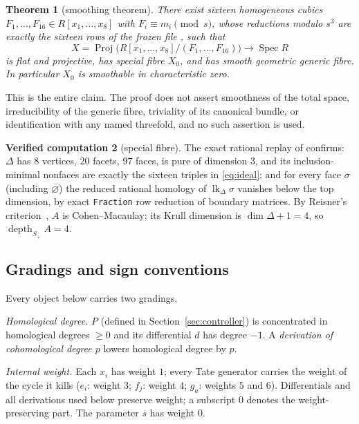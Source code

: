\documentclass[11pt]{article}
\newtheorem{theorem}{Theorem}[section]
\theoremstyle{definition}
\newtheorem{computation}[theorem]{Verified computation}
\theoremstyle{remark}
\newcommand{\Spec}{\operatorname{Spec}}
\newcommand{\Proj}{\operatorname{Proj}}
\newcommand{\depth}{\operatorname{depth}}
\begin{document}
\begin{theorem}[smoothing theorem]\label{thm:main}
There exist sixteen homogeneous cubics
$F_1,\ldots,F_{16}\in R[x_1,\ldots,x_8]$ with $F_i\equiv m_i\pmod s$, whose
reductions modulo $s^3$ are exactly the sixteen rows of the frozen file
, such that
\[
 X=\Proj\bigl(R[x_1,\ldots,x_8]/(F_1,\ldots,F_{16})\bigr)
 \longrightarrow\Spec R
\]
is flat and projective, has special fibre $X_0$, and has smooth geometric
generic fibre.  In particular $X_0$ is smoothable in characteristic zero.
\end{theorem}

This is the entire claim.  The proof does not assert smoothness of the total
space, irreducibility of the generic fibre, triviality of its canonical
bundle, or identification with any named threefold, and no such assertion is
used.

\begin{computation}[special fibre]\label{comp:special}
The exact rational replay of
 confirms: $\Delta$ has
$8$ vertices, $20$ facets, $97$ faces, is pure of dimension $3$, and its
inclusion-minimal nonfaces are exactly the sixteen triples in
\eqref{eq:ideal}; and for every face $\sigma$ (including $\varnothing$) the
reduced rational homology of $\operatorname{lk}_\Delta\sigma$ vanishes below
the top dimension, by exact \texttt{Fraction} row reduction of boundary
matrices.  By Reisner's criterion~\cite{Reisner}, $A$ is Cohen--Macaulay;
its Krull dimension is $\dim\Delta+1=4$, so $\depth_{S_+}A=4$.
\end{computation}

\subsection{Gradings and sign conventions}\label{subsec:conventions}

Every object below carries two gradings.

\emph{Homological degree.}  $P$ (defined in Section~\ref{sec:controller}) is
concentrated in homological degrees $\geq0$ and its differential $d$ has
degree $-1$.  A \emph{derivation of cohomological degree $p$} lowers
homological degree by $p$.

\emph{Internal weight.}  Each $x_i$ has weight $1$; every Tate generator
carries the weight of the cycle it kills ($e_i$: weight $3$; $f_j$: weight
$4$; $g_a$: weights $5$ and $6$).  Differentials and all derivations used
below preserve weight; a subscript $0$ denotes the weight-preserving part.
The parameter $s$ has weight $0$.
\end{document}

